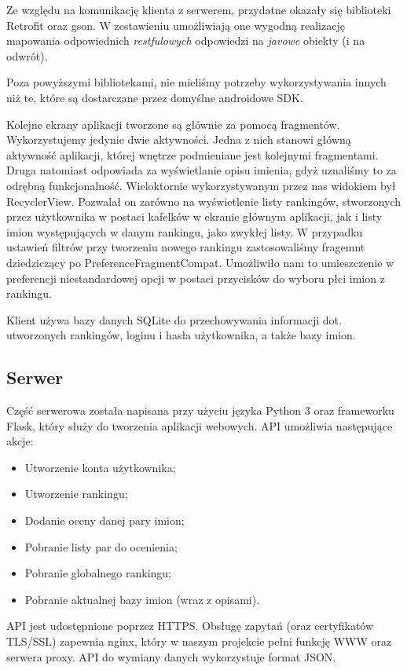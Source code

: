 \documentclass[12pt,a4paper]{article}
\begin{document}
Ze względu na komunikację klienta z serwerem, przydatne okazały się biblioteki Retrofit oraz gson.
W zestawieniu umożliwiają one wygodną realizację mapowania odpowiednich \textit{restfulowych} odpowiedzi na \textit{javowe} obiekty (i na odwrót).

Poza powyższymi bibliotekami, nie mieliśmy potrzeby wykorzystywania innych niż te, które są dostarczane przez domyślne androidowe SDK.

Kolejne ekrany aplikacji tworzone są głównie za pomocą fragmentów.
Wykorzystujemy jedynie dwie aktywności.
Jedna z nich stanowi główną aktywność aplikacji, której wnętrze podmieniane jest kolejnymi fragmentami.
Druga natomiast odpowiada za wyświetlanie opisu imienia, gdyż uznaliśmy to za odrębną funkcjonalność.
Wieloktornie wykorzystywanym przez nas widokiem był RecyclerView.
Pozwalał on zarówno na wyświetlenie listy rankingów, stworzonych przez użytkownika w postaci kafelków w ekranie głównym aplikacji, jak i listy imion występujących w danym rankingu, jako zwykłej listy.
W przypadku ustawień filtrów przy tworzeniu nowego rankingu zastosowaliśmy fragemnt dziedziczący po PreferenceFragmentCompat.
Umożliwiło nam to umieszczenie w preferencji niestandardowej opcji w postaci przycisków do wyboru płci imion z rankingu. 

Klient używa bazy danych SQLite do przechowywania informacji dot. utworzonych rankingów, loginu i hasła użytkownika, a także bazy imion.

\subsection{Serwer}
Część serwerowa została napisana przy użyciu języka Python 3 oraz frameworku Flask, który służy do tworzenia aplikacji webowych.
API umożliwia następujące akcje:

\begin{itemize}
    \item Utworzenie konta użytkownika;
    \item Utworzenie rankingu;
    \item Dodanie oceny danej pary imion;
    \item Pobranie listy par do ocenienia;
    \item Pobranie globalnego rankingu;
    \item Pobranie aktualnej bazy imion (wraz z opisami).
\end{itemize}

API jest udostępnione poprzez HTTPS.
Obsługę zapytań (oraz certyfikatów TLS/SSL) zapewnia nginx, który w naszym projekcie pełni funkcję WWW oraz serwera proxy.
API do wymiany danych wykorzystuje format JSON.
\end{document}
